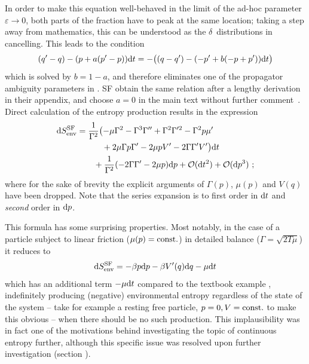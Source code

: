 In order to make this equation well-behaved in the limit of the ad-hoc parameter \(\varepsilon\to0\), both parts of the fraction have to peak at the same location; taking a step away from mathematics, this can be understood as the \(\delta\)~distributions in  cancelling. This leads to the condition 
%
\begin{equation}
	(q'-q)-(p+a(p'-p))\mathrm{d} t = -\bigl((q-q') - (-p'+b(-p+p'))\mathrm{d} t\bigr)
\end{equation}
%
which is solved by \(b = 1 - a\), and therefore eliminates one of the propagator ambiguity parameters in . SF obtain the same relation after a lengthy derivation in their appendix, and choose \(a = 0\) in the main text without further comment~\cite{sf}. Direct calculation of the entropy production results in the expression 
%
\begin{equation}\begin{split}
	\label{eqn:sf entropy production}
	\mathrm{d}S_\text{env}^{\text{SF}}
	&=\frac1{\Gamma^2}\bigl(
		- \mu\Gamma^2
		- \Gamma^3\Gamma''
		+ \Gamma^2\Gamma'^2
		- \Gamma^2p\mu'
	\\&\qquad\quad
		+ 2\mu\Gamma p\Gamma'
		- 2\mu pV'
		- 2 \Gamma\Gamma'V'
		\bigr) \mathrm{d} t
	\\&\qquad
		+\frac1{\Gamma^2}
		(-2\Gamma\Gamma' - 2\mu p) \mathrm{d} p
		+ \mathcal{O}(\mathrm{d} t^2) +  \mathcal{O}(\mathrm{d} p^3) ~;
\end{split}\end{equation}
%
where for the sake of brevity the explicit arguments of \(\Gamma(p)\), \(\mu(p)\) and \(V(q)\) have been dropped.
Note that the series expansion is to first order in \(\mathrm{d} t\) and \emph{second} order in \(\mathrm{d} p\).

This formula has some surprising properties. Most notably, in the case of a particle subject to linear friction (\(\mu(p) = \mathrm{const.}\)) in detailed balance (\(\Gamma = \sqrt{2T\mu}\)) it reduces to
%
\begin{align}
	\mathrm{d}S_\text{env}^{\text{SF}} = -\beta p \mathrm{d} p - \beta V'(q) \mathrm{d} q - \mu \mathrm{d} t
\end{align}
%
which has an additional term \(- \mu \mathrm{d} t\) compared to the textbook example , indefinitely producing (negative) environmental entropy regardless of the state of the system -- take for example a resting free particle, \(p=0,V=\mathrm{const.}\) to make this obvious -- when there should be no such production. This implausibility was in fact one of the motivations behind investigating the topic of continuous entropy further, although this specific issue was resolved upon further investigation (section ).

